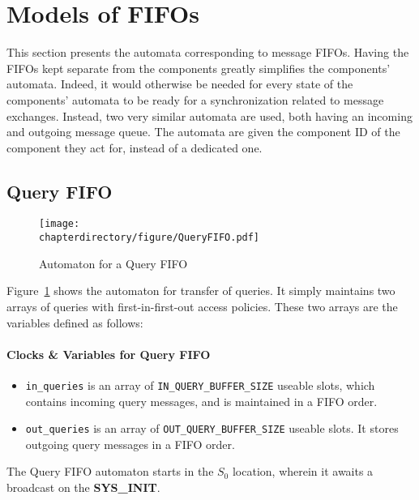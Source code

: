\section{Models of FIFOs}
\label{sec:model:fifos}
This section presents the automata corresponding to message FIFOs. Having the
FIFOs kept separate from the components greatly simplifies the components'
automata. Indeed, it would otherwise be needed for every state of the
components' automata to be ready for a synchronization related to message
exchanges. Instead, two very similar automata are used, both having an incoming
and outgoing message queue. The automata are given the component ID of the
component they act for, instead of a dedicated one.

\subsection{Query FIFO}
\begin{figure}[hbt!]
\begin{center}
\texttt{[image: \\chapterdirectory/figure/QueryFIFO.pdf]}
\end{center}
\caption{Automaton for a Query FIFO}
\label{fig:UPPAAL:QueryFIFO}
\end{figure}

Figure~\ref{fig:UPPAAL:QueryFIFO} shows the automaton for transfer of queries.
It simply maintains two arrays of queries with first-in-first-out access
policies. These two arrays are the variables defined as follows:
\paragraph{Clocks \& Variables for Query FIFO}
\begin{itemize}
\item
   \lstinline!in_queries! is an array of \lstinline!IN_QUERY_BUFFER_SIZE!
   useable slots, which contains incoming query messages, and is
   maintained in a FIFO order.
\item
   \lstinline!out_queries! is an array of \lstinline!OUT_QUERY_BUFFER_SIZE!
   useable slots. It stores outgoing query messages in a FIFO order.
\end{itemize}

The Query FIFO automaton starts in the $S_0$ location, wherein it awaits a
broadcast on the \textbf{SYS\_INIT}.


